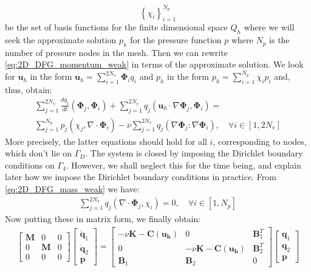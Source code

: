 \begin{equation*}
  \left\{\chi_i\right\}^{N_p}_{i = 1}
\end{equation*}
be the set of basis functions for the finite dimensional space $Q_h$ where we will seek the approximate solution $p_h$ for the pressure function $p$ where $N_p$ is the number of pressure nodes in the mesh. Then we can rewrite \cref{eq:2D_DFG_momentum_weak} in terms of the approximate solution. We look for $\mathbf{u}_h$ in the form $\mathbf{u}_h = \sum\limits_{i=1}^{2N_v}{\mathbf{\Phi}_iq_i}$ and $p_h$ in the form $p_h = \sum\limits_{i=1}^{N_p}{\chi_ip_i}$ and, thus, obtain:
{
\newcommand{\SUMU}{\sum\limits_{j=1}^{2N_v}}
\newcommand{\SUMP}{\sum\limits_{j=1}^{N_p}}
\newcommand{\UH}{\SUMU\mathbf{\Phi}_jq_j}
\newcommand{\PH}{\SUMP\mathbf{\chi}_jp_j}
\newcommand{\PHI}[1]{\mathbf{\Phi}_#1}
\newcommand{\ALLI}{\quad \forall i \in [1, 2N_v]}
\begin{multline*}
  \SUMU\frac{dq_j}{dt} \left(\PHI{j}, \PHI{i}\right)
  + \SUMU q_j\left(\mathbf{u}_h\cdot\nabla\PHI{j}, \PHI{i}\right) = \\
  \SUMP p_j\left(\chi_j, \nabla \cdot \PHI{i}\right)
  - \nu\SUMU q_j\left(\nabla\PHI{j} : \nabla\PHI{i}\right), \ALLI
\end{multline*}
}
More precisely, the latter equations should hold for all $i$, corresponding to nodes, which don't lie on $\Gamma_D$. The system is closed by imposing the Dirichlet boundary conditions on $\Gamma_4$. However, we shall neglect this for the time being, and explain later how we impose the Dirichlet boundary conditions in practice. From \cref{eq:2D_DFG_mass_weak} we have:
{
\newcommand{\ALLI}{\quad \forall i \in [1, N_p]}
\newcommand{\SUMU}{\sum\limits_{j=1}^{2N_v}}
\newcommand{\UH}{\SUMU\mathbf{\Phi}_jq_j}
\begin{align*}
  \SUMU q_j\left(\nabla\cdot\mathbf{\Phi}_j, \chi_i\right) = 0, \ALLI
\end{align*}
}
Now putting these in matrix form, we finally obtain:
\begin{multline}\label{eq:FEM-Matrix-Form}
  \begin{bmatrix}
  \mathbf{M} & 0 & 0 \\
  0 & \mathbf{M} & 0 \\
  0 & 0 & 0
  \end{bmatrix}
  \begin{bmatrix}
  \dot{\mathbf{q}}_1\\
  \dot{\mathbf{q}}_2\\
  \mathbf{p}
  \end{bmatrix}
  =
  \begin{bmatrix}
  -\nu\mathbf{K} - \mathbf{C(u_h)} & 0 & \mathbf{B}^T_1 \\
  0 & -\nu\mathbf{K} - \mathbf{C(u_h)} & \mathbf{B}^T_2 \\
  \mathbf{B}_1 & \mathbf{B}_2 & 0
  \end{bmatrix}
  \begin{bmatrix}
  \mathbf{q}_1\\
  \mathbf{q}_2\\
  \mathbf{p}
  \end{bmatrix}
\end{multline}
